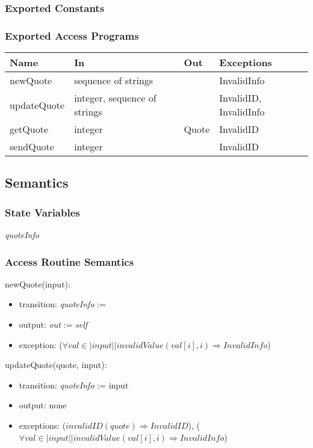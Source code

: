 \documentclass[12pt, titlepage]{article}
\begin{document}
\subsubsection{Exported Constants}

\subsubsection{Exported Access Programs}

\begin{center}
\begin{tabular}{p{5cm} p{4cm} p{4cm} p{2cm}}
\hline
\textbf{Name} & \textbf{In} & \textbf{Out} & \textbf{Exceptions} \\
\hline
newQuote & sequence of strings &  & InvalidInfo \\
updateQuote & integer, sequence of strings &  & InvalidID, InvalidInfo \\
getQuote & integer & Quote & InvalidID \\
sendQuote & integer & & InvalidID \\
\hline
\end{tabular}
\end{center}

\subsection{Semantics}

\subsubsection{State Variables}

\textit{quoteInfo}

\subsubsection{Access Routine Semantics}

\noindent newQuote(input):
\begin{itemize}
\item transition: \textit{quoteInfo} := 
\item output: \textit{out} := \textit{self}
\item exception: ($\forall val \in |input| | invalidValue(val[i], i) \Rightarrow InvalidInfo$)
\end{itemize}

\noindent updateQuote(quote, input):
\begin{itemize}
\item transition: \textit{quoteInfo} := input
\item output: none
\item exceptions: ($invalidID(quote) \Rightarrow InvalidID$), ($\forall val \in |input| | invalidValue(val[i], i) \Rightarrow InvalidInfo$)
\end{itemize}
\end{document}
